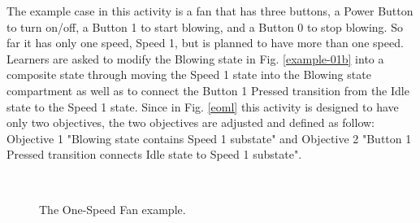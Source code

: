 \documentclass[conference]{IEEEtran}
\begin{document}
The example case in this activity is a fan that has three buttons, a Power Button to turn on/off, a Button 1 to start blowing, and a Button 0 to stop blowing. So far it has only one speed, Speed 1, but is planned to have more than one speed. Learners are asked to modify the Blowing state in Fig. \ref{example-01b} into a composite state through moving the Speed 1 state into the Blowing state compartment as well as to connect the Button 1 Pressed transition from the Idle state to the Speed 1 state. Since in Fig. \ref{eoml} this activity is designed to have only two objectives, the two objectives are adjusted and defined as follow: Objective 1 "Blowing state contains Speed 1 substate" and Objective 2 "Button 1 Pressed transition connects Idle state to Speed 1 substate".

\begin{figure}[th]
    \centering
    \\
	\caption{The One-Speed Fan example.}
    \label{example-01}
\end{figure}
\end{document}
